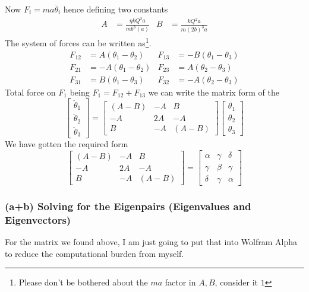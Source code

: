 \documentclass[letter, 10pts]{article}
\begin{document}
Now $F_i = m a \ddot{\theta_i}$ hence defining two constants 
\begin{align*}
A &= \frac{\eta k Q^2 a}{m b^3 (a) } 
  &B &= 
  \frac{k Q^2 a}{m (2b)^3 a}
\end{align*}
The system of forces can be written as\footnote{Please don't be bothered about the $ m a$ factor in $A , B$, consider it $1$ }.  
\begin{align*}
	F_{12} &= A(\theta_1 - \theta_2) 
	       &F_{13} &= - B(\theta_1 - \theta_3) \\
	       F_{21} &= - A (\theta_1 - \theta_2) 
		      &F_{23} &= A(\theta_2 - \theta_3) \\
		      F_{31} &= B(\theta_1 - \theta_3) 
			     &F_{32} &= - A(\theta_2 - \theta_3) 
\end{align*}
Total force on $F_1$ being $F_1 = F_{12} + F_{13}$ we can write the matrix form of the 
\[
\begin{bmatrix} \ddot{\theta}_1 \\
\ddot{\theta}_2 \\ 
\ddot{\theta}_3\end{bmatrix}  
= 
\begin{bmatrix} 
(A-B) & 
-A 
      & B \\
-A & 2A & -A \\ 
B & -A & (A-B) \end{bmatrix} 
\begin{bmatrix} \theta_1 \\ \theta_2 \\ \theta_3 \end{bmatrix} 
\] 
We have gotten the required form 
\[
\boxed{
\begin{bmatrix} 
(A-B) & 
-A 
      & B \\
-A & 2A & -A \\ 
B & -A & (A-B) \end{bmatrix}  
=
\begin{bmatrix} \alpha & \gamma & \delta \\ 
\gamma & \beta & \gamma \\ 
\delta & \gamma & \alpha\end{bmatrix} 
}
\] 


\subsubsection*{ (a+b) Solving for the Eigenpairs (Eigenvalues and Eigenvectors)} 
For the matrix we found above, I am just going to put that into Wolfram Alpha to reduce the computational burden from myself. 
\end{document}
